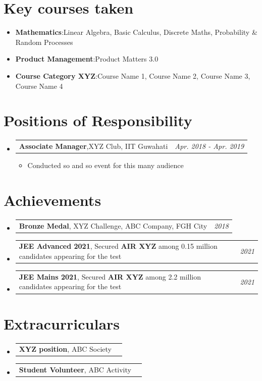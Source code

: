 \documentclass[a4paper,11pt]{article}
\makeatletter
\newcommand{\resumeItem}[2]{
  \item{
    \textbf{#1}{:\hspace{0.5mm}#2 \vspace{-0.5mm}}
  }
}
\newcommand{\resumePOR}[3]{
\vspace{0.5mm}\item
    \begin{tabular*}{0.97\textwidth}[t]{l@{\extracolsep{\fill}}r}
        \textbf{#1},\hspace{0.3mm}#2 & \textit{\small{#3}} 
    \end{tabular*}
    \vspace{-2mm}
}
\newcommand{\resumeSubItem}[2]{\resumeItem{#1}{#2}\vspace{-4pt}}
\newcommand{\resumeSubHeadingListStart}{\begin{itemize}[leftmargin=*,labelsep=0mm]}
\newcommand{\resumeHeadingSkillStart}{\begin{itemize}[leftmargin=*,itemsep=1.7mm, rightmargin=2ex]}
\newcommand{\resumeItemListStart}{\begin{justify}\begin{itemize}[leftmargin=3ex, rightmargin=2ex, noitemsep,labelsep=1.2mm,itemsep=0mm]\small}
\newcommand{\resumeSubHeadingListEnd}{\end{itemize}\vspace{2mm}}
\newcommand{\resumeHeadingSkillEnd}{\end{itemize}\vspace{-2mm}}
\newcommand{\resumeItemListEnd}{\end{itemize}\end{justify}\vspace{-2mm}}
\makeatother
\begin{document}
\section{Key courses taken}
\resumeHeadingSkillStart
 \resumeSubItem{Mathematics} %
    {Linear Algebra, Basic Calculus, Discrete Maths, Probability \& Random Processes }
 \resumeSubItem{Product Management} %
    {Product Matters 3.0} %
\resumeSubItem{Course Category XYZ}
 {Course Name 1, Course Name 2, Course Name 3, Course Name 4}
 \resumeHeadingSkillEnd


\section{Positions of Responsibility}
\vspace{-0.4mm}
\resumeSubHeadingListStart
\resumePOR{Associate Manager} %
    {XYZ Club, IIT Guwahati} %
    {Apr. 2018 - Apr. 2019} %
    \resumeItemListStart
        \item { Conducted so and so event for this many audience}
    \resumeItemListEnd
\resumeSubHeadingListEnd
\vspace{-6mm}

\section{Achievements}
\vspace{-0.2mm}
\resumeSubHeadingListStart
\resumePOR{Bronze Medal} %
    { XYZ Challenge, ABC Company, FGH City} %
    {2018} %
\resumePOR{JEE Advanced 2021} %
    { Secured \textbf{AIR XYZ} among 0.15 million candidates appearing for the test} %
    {2021} %
\resumePOR{JEE Mains 2021} %
    { Secured \textbf{AIR XYZ} among 2.2 million candidates appearing for the test} %
    {2021} %

\resumeSubHeadingListEnd
\vspace{-2mm}
\section{Extracurriculars}
\vspace{-0.4mm}
\resumeSubHeadingListStart
\resumePOR{XYZ position} %
    { ABC Society} %
    {} %
\resumePOR{Student Volunteer} %
    { ABC Activity} %
    {} %
\resumeSubHeadingListEnd
\vspace{-4mm}

\end{document}

